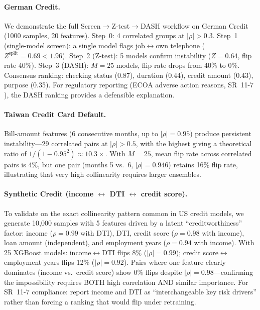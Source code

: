 \documentclass{jmlr}
\begin{document}
\paragraph{German Credit.}
We demonstrate the full Screen$\to$Z-test$\to$DASH workflow on German Credit (1000 samples, 20 features). Step~0: 4 correlated groups at $|\rho| > 0.3$. Step~1 (single-model screen): a single model flags job$\leftrightarrow$own telephone ($Z^{\text{split}} = 0.69 < 1.96$). Step~2 (Z-test): 5 models confirm instability ($Z = 0.64$, flip rate 40\%). Step~3 (DASH): $M = 25$ models, flip rate drops from 40\% to 0\%. Consensus ranking: checking status (0.87), duration (0.44), credit amount (0.43), purpose (0.35). For regulatory reporting (ECOA adverse action reasons, SR~11-7 \citep{occ2011sr117}), the DASH ranking provides a defensible explanation.

\paragraph{Taiwan Credit Card Default.}
Bill-amount features (6 consecutive months, up to $|\rho| = 0.95$) produce persistent instability---29 correlated pairs at $|\rho| > 0.5$, with the highest giving a theoretical ratio of $1/(1{-}0.95^2) \approx 10.3\times$. With $M = 25$, mean flip rate across correlated pairs is 4\%, but one pair (months 5 vs.\ 6, $|\rho| = 0.946$) retains 16\% flip rate, illustrating that very high collinearity requires larger ensembles.

\paragraph{Synthetic Credit (income $\leftrightarrow$ DTI $\leftrightarrow$ credit score).}
To validate on the exact collinearity pattern common in US credit models, we generate 10{,}000 samples with 5 features driven by a latent ``creditworthiness'' factor: income ($\rho = 0.99$ with DTI), DTI, credit score ($\rho = 0.98$ with income), loan amount (independent), and employment years ($\rho = 0.94$ with income). With 25 XGBoost models: income$\leftrightarrow$DTI flips 8\% ($|\rho| = 0.99$); credit score$\leftrightarrow$employment years flips 12\% ($|\rho| = 0.92$). Pairs where one feature clearly dominates (income vs.\ credit score) show 0\% flips despite $|\rho| = 0.98$---confirming the impossibility requires BOTH high correlation AND similar importance. For SR~11-7 \citep{occ2011sr117} compliance: report income and DTI as ``interchangeable key risk drivers'' rather than forcing a ranking that would flip under retraining.
\end{document}
